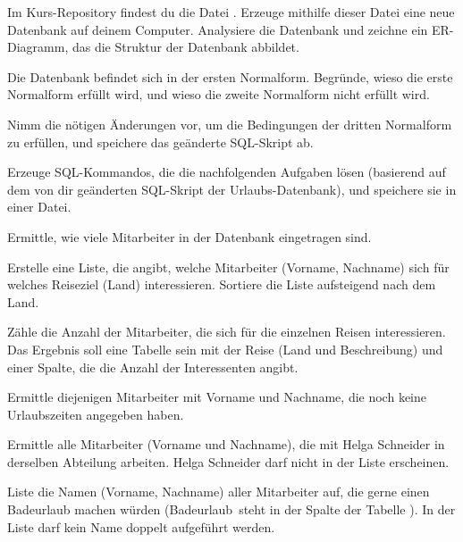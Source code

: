 \begin{compactenum}[a)]

\item Im Kurs-Repository findest du die Datei .
Erzeuge mithilfe dieser Datei eine neue Datenbank auf deinem Computer.
Analysiere die Datenbank und zeichne ein ER-Diagramm, das die Struktur der
Datenbank abbildet.

\item Die Datenbank befindet sich in der ersten Normalform. Begründe, wieso die
erste Normalform erfüllt wird, und wieso die zweite Normalform nicht erfüllt wird.

\item Nimm die nötigen Änderungen vor, um die Bedingungen der dritten
Normalform zu erfüllen, und speichere das geänderte SQL-Skript ab.

\item Erzeuge SQL-Kommandos, die die nachfolgenden Aufgaben lösen (basierend
auf dem von dir geänderten SQL-Skript der Urlaubs-Datenbank), und speichere sie
in einer Datei.

\begin{compactenum}[1.]
\item Ermittle, wie viele Mitarbeiter in der Datenbank eingetragen sind.

\item Erstelle eine Liste, die angibt, welche Mitarbeiter (Vorname, Nachname)
sich für welches Reiseziel (Land) interessieren. Sortiere die Liste aufsteigend
nach dem Land.

\item Zähle die Anzahl der Mitarbeiter, die sich für die einzelnen Reisen
interessieren. Das Ergebnis soll eine Tabelle sein mit der Reise (Land und
Beschreibung) und einer Spalte, die die Anzahl der Interessenten angibt.

\item Ermittle diejenigen Mitarbeiter mit Vorname und Nachname, die noch keine
Urlaubszeiten angegeben haben.

\item Ermittle alle Mitarbeiter (Vorname und Nachname), die mit Helga Schneider
in derselben Abteilung arbeiten. Helga Schneider darf nicht in der Liste
erscheinen.

\item Liste die Namen (Vorname, Nachname) aller Mitarbeiter auf, die gerne einen
Badeurlaub machen würden (\glqq Badeurlaub\grqq\ steht in der Spalte
 der Tabelle ). In der Liste
darf kein Name doppelt aufgeführt werden.


\end{compactenum}
\end{compactenum}
